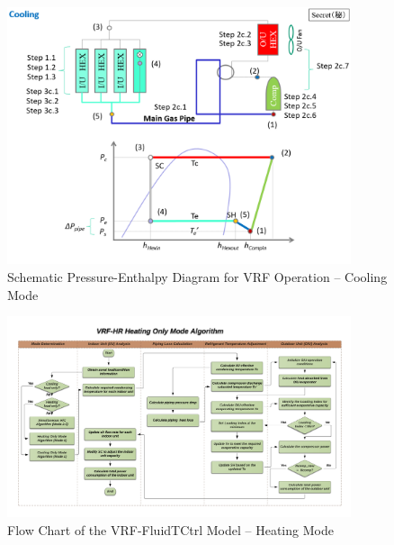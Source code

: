 \begin{figure}[hbtp] %
\centering
\includegraphics[width=0.9\textwidth, height=0.9\textheight, keepaspectratio=true]{media/VRF-FluidTCtrl-2b.png}
\caption{Schematic Pressure-Enthalpy Diagram for VRF Operation -- Cooling Mode \label{fig:vrf-fluid-t-ctrl-2b}}
\end{figure}

\begin{figure}[hbtp] %
\centering
\includegraphics[width=0.9\textwidth, height=0.9\textheight, keepaspectratio=true]{media/VRF-FluidTCtrl-3a.png}
\caption{Flow Chart of the VRF-FluidTCtrl Model -- Heating Mode \label{fig:vrf-fluid-t-ctrl-3a}}
\end{figure}

